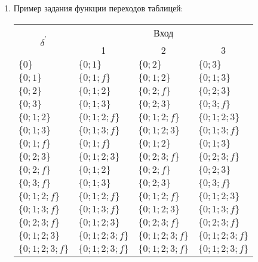 \documentclass[fleqn,12pt, a4paper]{article}
\begin{document}
\begin{enumerate}[label=(\roman{*})]
	\item Пример задания функции переходов таблицей:\\
		\begin{tabular}{llll}
		\toprule
		\multicolumn{1}{c}{\multirow{2}{*}{\Large $\delta^\prime$}}
			& \multicolumn{3}{c}{Вход} \\
		\cmidrule(rl){2-4}
			& \multicolumn{1}{c}{1}
				& \multicolumn{1}{c}{2}
				& \multicolumn{1}{c}{3} \\
		\midrule
		$\{0\}$         & $\{0;1\}$       & $\{0;2\}$       & $\{0;3\}$       \\
		$\{0;1\}$       & $\{0;1;f\}$     & $\{0;1;2\}$     & $\{0;1;3\}$     \\
		$\{0;2\}$       & $\{0;1;2\}$     & $\{0;2;f\}$     & $\{0;2;3\}$     \\
		$\{0;3\}$       & $\{0;1;3\}$     & $\{0;2;3\}$     & $\{0;3;f\}$     \\
		$\{0;1;2\}$     & $\{0;1;2;f\}$   & $\{0;1;2;f\}$   & $\{0;1;2;3\}$   \\
		$\{0;1;3\}$     & $\{0;1;3;f\}$   & $\{0;1;2;3\}$   & $\{0;1;3;f\}$   \\
		$\{0;1;f\}$     & $\{0;1;f\}$     & $\{0;1;2\}$     & $\{0;1;3\}$     \\
		$\{0;2;3\}$     & $\{0;1;2;3\}$   & $\{0;2;3;f\}$   & $\{0;2;3;f\}$   \\
		$\{0;2;f\}$     & $\{0;1;2\}$     & $\{0;2;f\}$     & $\{0;2;3\}$     \\
		$\{0;3;f\}$     & $\{0;1;3\}$     & $\{0;2;3\}$     & $\{0;3;f\}$     \\
		$\{0;1;2;f\}$   & $\{0;1;2;f\}$   & $\{0;1;2;f\}$   & $\{0;1;2;3\}$   \\
		$\{0;1;3;f\}$   & $\{0;1;3;f\}$   & $\{0;1;2;3\}$   & $\{0;1;3;f\}$   \\
		$\{0;2;3;f\}$   & $\{0;1;2;3\}$   & $\{0;2;3;f\}$   & $\{0;2;3;f\}$   \\
		$\{0;1;2;3\}$   & $\{0;1;2;3;f\}$ & $\{0;1;2;3;f\}$ & $\{0;1;2;3;f\}$ \\
		$\{0;1;2;3;f\}$ & $\{0;1;2;3;f\}$ & $\{0;1;2;3;f\}$ & $\{0;1;2;3;f\}$ \\ \bottomrule
		\end{tabular}
\end{enumerate}
\end{document}
